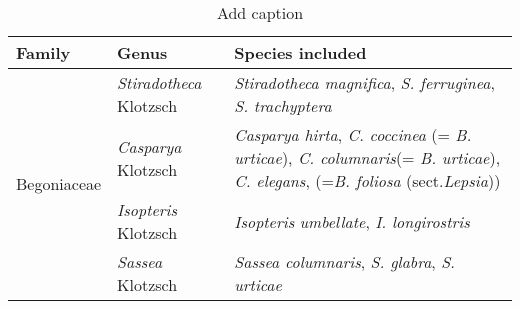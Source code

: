 \begin{table}[htbp]
  \centering
  \caption{Add caption}
    \begin{tabular}{cll}
    \toprule
    \multicolumn{1}{l}{Family} & Genus & Species included \\
    \midrule
    \multirow{4}[8]{*}{Begoniaceae} & \textit{Stiradotheca} Klotzsch & \textit{Stiradotheca magnifica}, \textit{S. ferruginea}, \textit{S. trachyptera} \\
\cmidrule{2-3}          & \textit{Casparya} Klotzsch & \multicolumn{1}{p{37.355em}}{\textit{Casparya hirta}, \textit{C. coccinea} (= \textit{B. urticae}), \textit{C. columnaris}\newline{}(= \textit{B. urticae}), \textit{C. elegans}, (=\textit{B. foliosa} (sect.\newline{}\textit{Lepsia}))} \\
\cmidrule{2-3}          & \textit{Isopteris} Klotzsch & \textit{Isopteris} \textit{umbellate}, \textit{I. longirostris} \\
\cmidrule{2-3}          & \textit{Sassea} Klotzsch & \textit{Sassea columnaris}, \textit{S. glabra}, \textit{S. urticae} \\
    \bottomrule
    \bottomrule
    \end{tabular}%
  \label{tab:addlabel}%
\end{table}%
